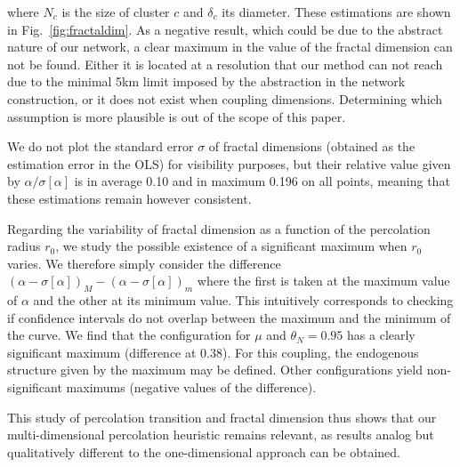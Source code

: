 \documentclass{jimis-en}
\begin{document}
where $N_c$ is the size of cluster $c$ and $\delta_c$ its diameter. These estimations are shown in Fig.~\ref{fig:fractaldim}. As a negative result, which could be due to the abstract nature of our network, a clear maximum in the value of the fractal dimension can not be found. Either it is located at a resolution that our method can not reach due to the minimal 5km limit imposed by the abstraction in the network construction, or it does not exist when coupling dimensions. Determining which assumption is more plausible is out of the scope of this paper.

We do not plot the standard error $\sigma$ of fractal dimensions (obtained as the estimation error in the OLS) for visibility purposes, but their relative value given by $\alpha / \sigma\left[\alpha\right]$ is in average 0.10 and in maximum 0.196 on all points, meaning that these estimations remain however consistent.

Regarding the variability of fractal dimension as a function of the percolation radius $r_0$, we study the possible existence of a significant maximum when $r_0$ varies. We therefore simply consider the difference $(\alpha - \sigma\left[\alpha\right])_M - (\alpha - \sigma\left[\alpha\right])_m$ where the first is taken at the maximum value of $\alpha$ and the other at its minimum value. This intuitively corresponds to checking if confidence intervals do not overlap between the maximum and the minimum of the curve. We find that the configuration for $\mu$ and $\theta_N=0.95$ has a clearly significant maximum (difference at 0.38). For this coupling, the endogenous structure given by the maximum may be defined. Other configurations yield non-significant maximums (negative values of the difference).


This study of percolation transition and fractal dimension thus shows that our multi-dimensional percolation heuristic remains relevant, as results analog but qualitatively different to the one-dimensional approach can be obtained.


\end{document}
